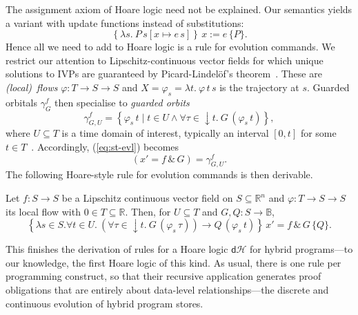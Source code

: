 \documentclass[envcountsame]{llncs}
\newcommand{\dH}{\mathsf{d}\mathcal{H}}
\newcommand{\flow}{\varphi}
\newcommand{\reals}{\mathbb{R}}
\newcommand{\bools}{\mathbb{B}}
\begin{document}
The assignment axiom of Hoare logic need not be explained. Our
semantics yields a variant with update functions instead
of substitutions:
\begin{equation}
\left\{\lambda s.\ P\, s[x\mapsto e\, s]\right\}\,  x:=e\, \{P\}. \label{eq:h-assgn}\tag{h-assgn}
\end{equation}
Hence all we need to add to Hoare logic is a rule for evolution
commands.  We restrict our attention to Lipschitz-continuous vector
fields for which unique solutions to IVPs are guaranteed by
Picard-Lindel\"of's theorem~\cite{Teschl12}.  These are \emph{(local)\
  flows} $\flow:T\to S\to S$ and $X=\flow_s=\lambda t.\ \flow\, t\, s$
is the trajectory at $s$. Guarded orbitals $\gamma^f_G$ then
specialise to \emph{guarded orbits}
\begin{equation*}
  \gamma^f_{G,U} = \left\{\flow_s\, t\mid t\in U\land \forall\tau \in
  {\downarrow}t.\ G\, (\flow_s\, t)\right\},
\end{equation*}
where $U\subseteq T$ is a time domain of interest, typically an
interval $[0,t]$ for some $t\in T$~\cite{MuniveS19}.  Accordingly,
(\ref{eq:st-evl}) becomes
\begin{equation}
  \left(x' = f\, \&\, G\right)= \gamma^f_{G,U}.\label{eq:st-evl-flow}\tag{st-evl-flow}
\end{equation}
The following Hoare-style rule for evolution commands is then
derivable.
\begin{lemma}\label{P:h-evl-lemma}
  Let $f:S\to S$ be a Lipschitz continuous vector field on
  $S\subseteq \reals^n$ and $\flow:T\to S\to S$ its local flow with
  $0\in T\subseteq \reals$. Then, for $U\subseteq T$ and
  $G,Q:S\to\bools$,
\begin{equation}
\left\{\lambda s\in S.\forall t\in U.\ \left(\forall
\tau\in {\downarrow}t.\ G\, (\flow_s\, \tau)\right) \rightarrow Q\,
(\flow_s\, t)\right\}\, x' = f\, \&\, G\, \{Q\}. \label{eq:h-evl}\tag{h-evl}
\end{equation}
\end{lemma}

This finishes the derivation of rules for a Hoare logic $\dH$ for
hybrid programs---to our knowledge, the first Hoare logic of this
kind. As usual, there is one rule per programming construct, so that
their recursive application generates proof obligations that are
entirely about data-level relationships---the discrete and continuous
evolution of hybrid program stores.
\end{document}

